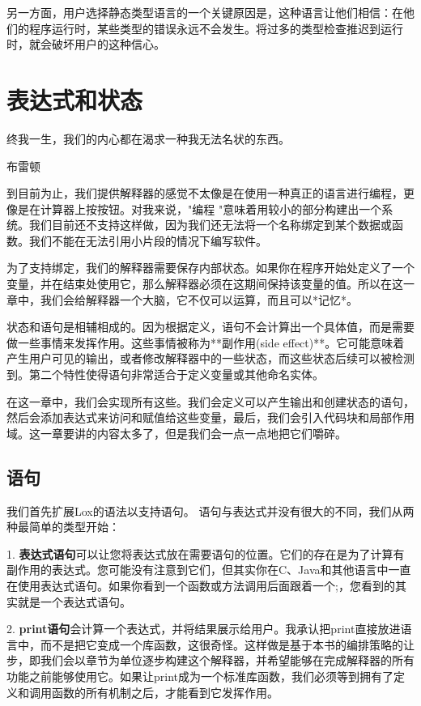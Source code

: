 \documentclass[cn,11pt,chinese]{elegantbook}
\begin{document}
另一方面，用户选择静态类型语言的一个关键原因是，这种语言让他们相信：在他们的程序运行时，某些类型的错误永远不会发生。将过多的类型检查推迟到运行时，就会破坏用户的这种信心。

\chapter{表达式和状态}

\epigraph{终我一生，我们的内心都在渴求一种我无法名状的东西。}{布雷顿}

到目前为止，我们提供解释器的感觉不太像是在使用一种真正的语言进行编程，更像是在计算器上按按钮。对我来说，"编程 "意味着用较小的部分构建出一个系统。我们目前还不支持这样做，因为我们还无法将一个名称绑定到某个数据或函数。我们不能在无法引用小片段的情况下编写软件。

为了支持绑定，我们的解释器需要保存内部状态。如果你在程序开始处定义了一个变量，并在结束处使用它，那么解释器必须在这期间保持该变量的值。所以在这一章中，我们会给解释器一个大脑，它不仅可以运算，而且可以*记忆*。

状态和语句是相辅相成的。因为根据定义，语句不会计算出一个具体值，而是需要做一些事情来发挥作用。这些事情被称为**副作用(side effect)**。它可能意味着产生用户可见的输出，或者修改解释器中的一些状态，而这些状态后续可以被检测到。第二个特性使得语句非常适合于定义变量或其他命名实体。

在这一章中，我们会实现所有这些。我们会定义可以产生输出和创建状态的语句，然后会添加表达式来访问和赋值给这些变量，最后，我们会引入代码块和局部作用域。这一章要讲的内容太多了，但是我们会一点一点地把它们嚼碎。

\section{语句}

我们首先扩展Lox的语法以支持语句。 语句与表达式并没有很大的不同，我们从两种最简单的类型开始：

1. \textbf{表达式语句}可以让您将表达式放在需要语句的位置。它们的存在是为了计算有副作用的表达式。您可能没有注意到它们，但其实你在C、Java和其他语言中一直在使用表达式语句。如果你看到一个函数或方法调用后面跟着一个;，您看到的其实就是一个表达式语句。

2. \textbf{print语句}会计算一个表达式，并将结果展示给用户。我承认把print直接放进语言中，而不是把它变成一个库函数，这很奇怪。这样做是基于本书的编排策略的让步，即我们会以章节为单位逐步构建这个解释器，并希望能够在完成解释器的所有功能之前能够使用它。如果让print成为一个标准库函数，我们必须等到拥有了定义和调用函数的所有机制之后，才能看到它发挥作用。
\end{document}
